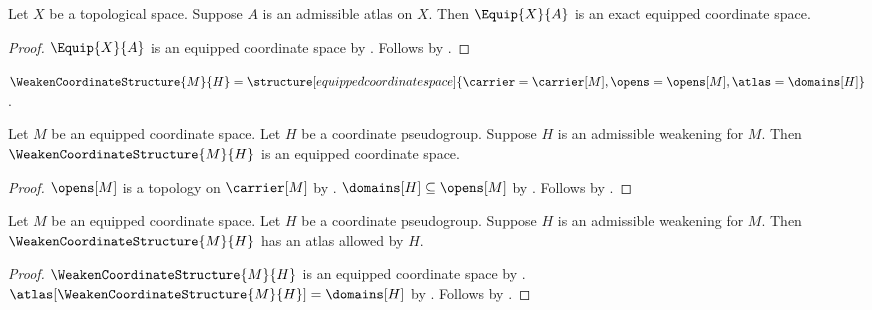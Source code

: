 \begin{theorem}\label{equipshape}
    Let $X$ be a topological space.
    Suppose $A$ is an admissible atlas on $X$.
    Then $\Equip{X}{A}$ is an exact equipped coordinate space.
\end{theorem}
\begin{proof}
    $\Equip{X}{A}$ is an equipped coordinate space by .
    Follows by .
\end{proof}

\begin{definition}\label{weaken_coordinate_structure}
    $\WeakenCoordinateStructure{M}{H}=\structure[equipped coordinate space]{
        \carrier=\carrier[M],\opens=\opens[M],\atlas=\domains[H]}$.
\end{definition}

\begin{classification}\label{weaken_coordinate_structure_result}
    Let $M$ be an equipped coordinate space.
    Let $H$ be a coordinate pseudogroup.
    Suppose $H$ is an admissible weakening for $M$.
    Then $\WeakenCoordinateStructure{M}{H}$ is an equipped coordinate space.
\end{classification}
\begin{proof}
    $\opens[M]$ is a topology on $\carrier[M]$
        by .
    $\domains[H]\subseteq\opens[M]$ by .
    Follows by .
\end{proof}

\begin{theorem}\label{weaken_coordinate_structure_allowed}
    Let $M$ be an equipped coordinate space.
    Let $H$ be a coordinate pseudogroup.
    Suppose $H$ is an admissible weakening for $M$.
    Then $\WeakenCoordinateStructure{M}{H}$ has an atlas allowed by $H$.
\end{theorem}
\begin{proof}
    $\WeakenCoordinateStructure{M}{H}$ is an equipped coordinate space
        by .
    $\atlas[\WeakenCoordinateStructure{M}{H}]=\domains[H]$
        by .
    Follows by .
\end{proof}


